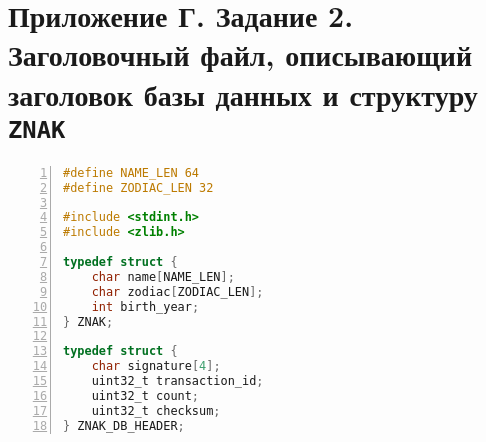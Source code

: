 \section*{Приложение Г. Задание 2. Заголовочный файл, описывающий заголовок базы данных и структуру \texttt{ZNAK}}

\begin{lstlisting}[language=C,label={lst:move_array},numbers=left]
#define NAME_LEN 64
#define ZODIAC_LEN 32

#include <stdint.h>
#include <zlib.h>

typedef struct {
    char name[NAME_LEN];
    char zodiac[ZODIAC_LEN];
    int birth_year;
} ZNAK;

typedef struct {
    char signature[4];
    uint32_t transaction_id;
    uint32_t count;
    uint32_t checksum;
} ZNAK_DB_HEADER;
\end{lstlisting}